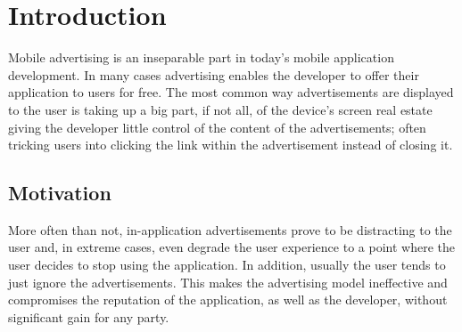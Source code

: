 

\chapter{Introduction}

\ifpdf
    \graphicspath{{1_introduction/figures/PNG/}{1_introduction/figures/PDF/}{1_introduction/figures/}}
\else
    \graphicspath{{1_introduction/figures/EPS/}{1_introduction/figures/}}
\fi





Mobile advertising is an inseparable part in today's mobile application development. In many cases advertising enables the developer to offer their application to users for free. The most common way advertisements are displayed to the user is taking up a big part, if not all, of the device's screen real estate giving the developer little control of the content of the advertisements; often tricking users into clicking the link within the advertisement instead of closing it.

\section{Motivation}
More often than not, in-application advertisements prove to be distracting to the user and, in extreme cases, even degrade the user experience to a point where the user decides to stop using the application.  In addition, usually the user tends to just ignore the advertisements. This makes the advertising model ineffective and compromises the reputation of the application, as well as the developer, without significant gain for any party.

